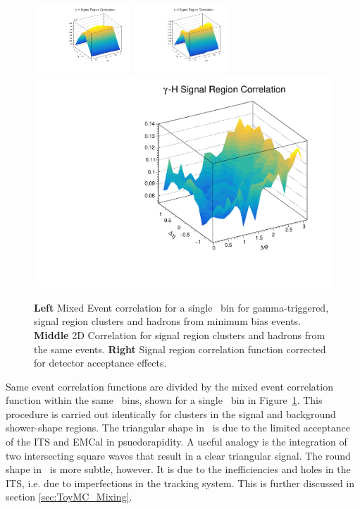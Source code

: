 \begin{figure}
  \includegraphics[width=0.32\textwidth]{Data_Analysis/G-H_New/2D_SR_ME.pdf}
  \includegraphics[width=0.32\textwidth]{Data_Analysis/G-H_New/2D_SR_SE.pdf}
  \includegraphics[width = 0.32 \textwidth]{Data_Analysis/G-H_New/2D_SR.pdf}
  \caption{\textbf{Left} Mixed Event correlation for a single \zt~bin for gamma-triggered, signal region clusters and hadrons from minimum bias events. \textbf{Middle} 2D Correlation for signal region clusters and hadrons from the same events. \textbf{Right} Signal region correlation function corrected for detector acceptance effects.}
  \label{fig:SR_2D}
\end{figure}

Same event correlation functions are divided by the mixed event correlation function within the same \zt~bins, shown for a single \zt~bin in Figure~\ref{fig:SR_2D}. This procedure is carried out identically for clusters in the signal and background shower-shape regions. The triangular shape in \deltaeta~is due to the limited acceptance of the ITS and EMCal in psuedorapidity. A useful analogy is the integration of two intersecting square waves that result in a clear triangular signal. The round shape in \deltaphi~is more subtle, however. It is due to the inefficiencies and holes in the ITS, i.e. due to imperfections in the tracking system. This is further discussed in section \ref{sec:ToyMC_Mixing}.




